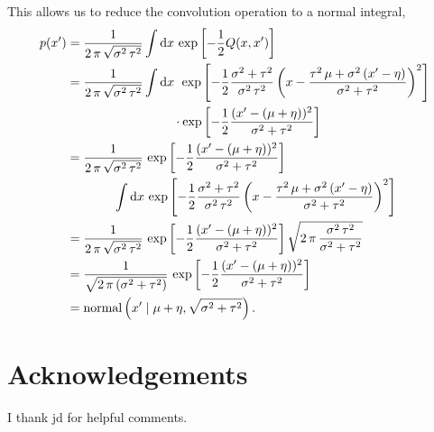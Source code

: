 \documentclass[
  letterpaper,
  DIV=11,
  numbers=noendperiod]{scrartcl}
\begin{document}
This allows us to reduce the convolution operation to a normal integral,
\begin{align*}
p( x' )
&=
\frac{1}{ 2 \, \pi \, \sqrt{ \sigma^{2} \, \tau^{2} } }
\int \mathrm{d} x \,
\exp \left[
  -\frac{1}{2} Q(x, x')
\right]
\\
&=
\frac{1}{ 2 \, \pi \, \sqrt{ \sigma^{2} \, \tau^{2} } }
\int \mathrm{d} x \, \;
\exp \left[
  -\frac{1}{2}
  \frac{\sigma^{2} + \tau^{2} }{ \sigma^{2} \, \tau^{2} }
  \left(
    x -
    \frac{
      \tau^{2} \, \mu + \sigma^{2} \, (x' - \eta)
    }{
      \sigma^{2} + \tau^{2}
    }
  \right)^{2}
\right]
\\
&\hspace{29.75mm} \cdot
\exp \left[
  -\frac{1}{2}
  \frac{  ( x ' - (\mu + \eta) )^{2} }{ \sigma^{2} + \tau^{2} }
\right]
\\
&=
\frac{1}{ 2 \, \pi \, \sqrt{ \sigma^{2} \, \tau^{2} } } \,
\exp \left[
  -\frac{1}{2}
  \frac{  ( x ' - (\mu + \eta) )^{2} }{ \sigma^{2} + \tau^{2} }
\right]
\\
&\hspace{13mm}
\int \mathrm{d} x \,
\exp \left[
  -\frac{1}{2}
  \frac{\sigma^{2} + \tau^{2} }{ \sigma^{2} \, \tau^{2} }
  \left(
    x -
    \frac{
      \tau^{2} \, \mu + \sigma^{2} \, (x' - \eta)
    }{
      \sigma^{2} + \tau^{2}
    }
  \right)^{2}
\right]
\\
&=
\frac{1}{ 2 \, \pi \, \sqrt{ \sigma^{2} \, \tau^{2} } } \,
\exp \left[
  -\frac{1}{2}
  \frac{  ( x ' - (\mu + \eta) )^{2} }{ \sigma^{2} + \tau^{2} }
\right]
\sqrt{
  2 \, \pi \,
  \frac{ \sigma^{2} \, \tau^{2} }{\sigma^{2} + \tau^{2} }
}
\\
&=
\frac{1}{ \sqrt{ 2 \, \pi \, ( \sigma^{2} + \tau^{2} ) } } \,
\exp \left[
  -\frac{1}{2}
  \frac{  ( x ' - (\mu + \eta) )^{2} }{ \sigma^{2} + \tau^{2} }
\right]
\\
&=
\text{normal} \left( x' \mid \mu + \eta,
                     \sqrt{ \sigma^{2} + \tau^{2} } \right).
\end{align*}

\section*{Acknowledgements}\label{acknowledgements}

I thank jd for helpful comments.
\end{document}
